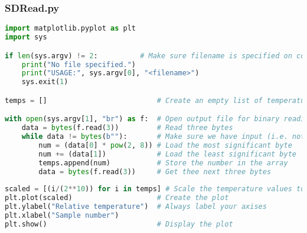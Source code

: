 \subsubsection{SDRead.py}
\begin{lstlisting}[language=Python]
import matplotlib.pyplot as plt
import sys

if len(sys.argv) != 2:			# Make sure filename is specified on command line
	print("No file specified.")	
	print("USAGE:", sys.argv[0], "<filename>")
	sys.exit(1)

temps = []							# Create an empty list of temperatures

with open(sys.argv[1], "br") as f:	# Open output file for binary reading
	data = bytes(f.read(3))			# Read three bytes
	while data != bytes(b""):		# Make sure we have input (i.e. not EOF)
		num = (data[0] * pow(2, 8))	# Load the most significant byte
		num += (data[1])			# Load the least significant byte
		temps.append(num)			# Store the number in the array
		data = bytes(f.read(3))		# Get thee next three bytes
	
scaled = [(i/(2**10)) for i in temps] # Scale the temperature values to between 0-1
plt.plot(scaled)					# Create the plot
plt.ylabel("Relative temperature")	# Always label your axises
plt.xlabel("Sample number")			
plt.show()							# Display the plot
\end{lstlisting}


